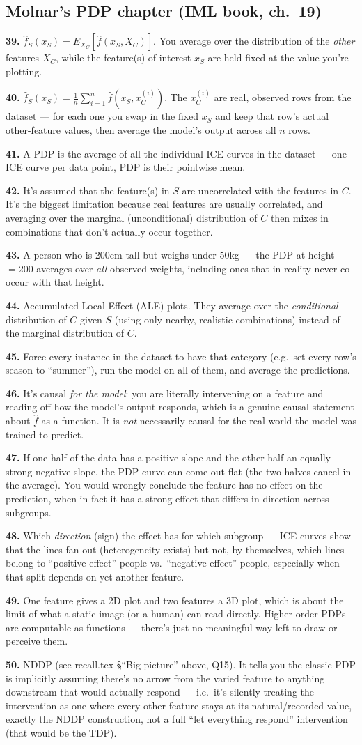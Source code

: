 \documentclass[11pt]{article}
\newcommand{\qa}[2]{\par\noindent\textbf{#1.} #2\par\smallskip}
\begin{document}
\subsection*{Molnar's PDP chapter (IML book, ch.\ 19)}
\qa{39}{$\hat f_S(x_S) = E_{X_C}[\hat f(x_S, X_C)]$. You average over the
  distribution of the \emph{other} features $X_C$, while the feature(s) of
  interest $x_S$ are held fixed at the value you're plotting.}
\qa{40}{$\hat f_S(x_S) = \frac1n\sum_{i=1}^n \hat f(x_S, x_C^{(i)})$. The
  $x_C^{(i)}$ are real, observed rows from the dataset --- for each one you
  swap in the fixed $x_S$ and keep that row's actual other-feature values,
  then average the model's output across all $n$ rows.}
\qa{41}{A PDP is the average of all the individual ICE curves in the
  dataset --- one ICE curve per data point, PDP is their pointwise mean.}
\qa{42}{It's assumed that the feature(s) in $S$ are uncorrelated with the
  features in $C$. It's the biggest limitation because real features are
  usually correlated, and averaging over the marginal (unconditional)
  distribution of $C$ then mixes in combinations that don't actually occur
  together.}
\qa{43}{A person who is 200cm tall but weighs under 50kg --- the PDP at
  height$=200$ averages over \emph{all} observed weights, including ones
  that in reality never co-occur with that height.}
\qa{44}{Accumulated Local Effect (ALE) plots. They average over the
  \emph{conditional} distribution of $C$ given $S$ (using only nearby,
  realistic combinations) instead of the marginal distribution of $C$.}
\qa{45}{Force every instance in the dataset to have that category (e.g.\
  set every row's season to ``summer''), run the model on all of them, and
  average the predictions.}
\qa{46}{It's causal \emph{for the model}: you are literally intervening on
  a feature and reading off how the model's output responds, which is a
  genuine causal statement about $\hat f$ as a function. It is \emph{not}
  necessarily causal for the real world the model was trained to predict.}
\qa{47}{If one half of the data has a positive slope and the other half an
  equally strong negative slope, the PDP curve can come out flat (the two
  halves cancel in the average). You would wrongly conclude the feature has
  no effect on the prediction, when in fact it has a strong effect that
  differs in direction across subgroups.}
\qa{48}{Which \emph{direction} (sign) the effect has for which subgroup ---
  ICE curves show that the lines fan out (heterogeneity exists) but not, by
  themselves, which lines belong to ``positive-effect'' people vs.\
  ``negative-effect'' people, especially when that split depends on yet
  another feature.}
\qa{49}{One feature gives a 2D plot and two features a 3D plot, which is
  about the limit of what a static image (or a human) can read directly.
  Higher-order PDPs are computable as functions --- there's just no
  meaningful way left to draw or perceive them.}
\qa{50}{NDDP (see recall.tex \S``Big picture'' above, Q15). It tells you the
  classic PDP is implicitly assuming there's no arrow from the varied
  feature to anything downstream that would actually respond --- i.e.\ it's
  silently treating the intervention as one where every other feature stays
  at its natural/recorded value, exactly the NDDP construction, not a full
  ``let everything respond'' intervention (that would be the TDP).}
\end{document}
